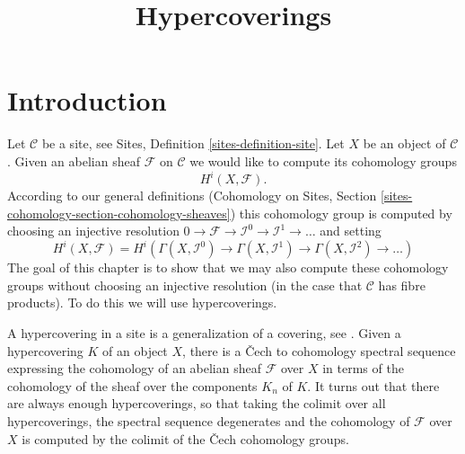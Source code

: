 \documentclass{stacks-project}
\theoremstyle{plain}
\theoremstyle{definition}
\theoremstyle{remark}
\numberwithin{equation}{subsection}
\begin{document}
\title{Hypercoverings}


\maketitle

\label{section-phantom}

\tableofcontents

\section{Introduction}
\label{section-introduction}

\noindent
Let $\mathcal{C}$ be a site, see Sites, Definition \ref{sites-definition-site}.
Let $X$ be an object of $\mathcal{C}$.
Given an abelian sheaf $\mathcal{F}$
on $\mathcal{C}$ we would like to compute
its cohomology groups
$$
H^i(X, \mathcal{F}).
$$
According to our general definitions (Cohomology on Sites, Section
\ref{sites-cohomology-section-cohomology-sheaves})
this cohomology group is computed by
choosing an injective resolution
$
0 \to \mathcal{F} \to \mathcal{I}^0 \to \mathcal{I}^1 \to \ldots
$
and setting
$$
H^i(X, \mathcal{F})
=
H^i(
\Gamma(X, \mathcal{I}^0) \to
\Gamma(X, \mathcal{I}^1) \to
\Gamma(X, \mathcal{I}^2)\to \ldots)
$$
The goal of this chapter is to show that we may also compute these
cohomology groups without choosing an injective resolution
(in the case that $\mathcal{C}$ has fibre products). To do this
we will use hypercoverings.

\medskip\noindent
A hypercovering in a site is a generalization of a covering, see
\cite[Expos\'e V, Sec. 7]{SGA4}. Given a hypercovering $K$ of an object
$X$, there is a {\v C}ech to cohomology spectral sequence
expressing the cohomology of an abelian sheaf $\mathcal{F}$
over $X$ in terms of the cohomology of the sheaf over the
components $K_n$ of $K$. It turns out that there are always
enough hypercoverings, so that taking the colimit over all hypercoverings,
the spectral sequence degenerates and the cohomology of $\mathcal{F}$
over $X$ is computed by the colimit of the {\v C}ech cohomology groups.
\end{document}

